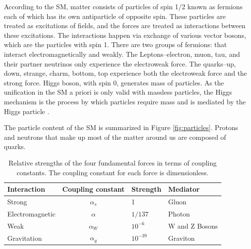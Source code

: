 According to the SM, matter consists of particles of spin 1/2 known as fermions each of which has its own antiparticle of opposite spin. These particles are treated as excitations of fields, and the forces are treated as interactions between these excitations. The interactions happen via exchange of various vector bosons, which are the particles with spin 1. There are two groups of fermions: that interact electromagnetically and weakly. The Leptons--electron, muon, tau, and their partner neutrinos only experience the electroweak force. The quarks--up, down, strange, charm, bottom, top experience both the electroweak force and the strong force. Higgs boson, with spin 0, generates mass of particles. As the unification in the SM a priori is only valid with massless particles, the Higgs mechanism is the process by which particles require mass \cite{Weinberg:1967,Salam:1968} and is mediated by the Higgs particle \cite{PhysRevLett.13.321, PhysRevLett.13.508}.


The particle content of the SM is summarized in Figure \ref{fig:particles}. Protons and neutrons that make up most of the matter around us are composed of quarks.

\begin{table}
\begin{center}
    \begin{tabular}{| l | c | l | l |}
    \hline
    {\bf Interaction} &  {\bf Coupling constant} & {\bf Strength} & {\bf Mediator} \\ \hline
    Strong & $\alpha_{s}$& 1  & Gluon \\ \hline
    Electromagnetic &$ \alpha $&  $1/137$  & Photon \\ \hline
    Weak & $\alpha_{W}$ &$10^{-6}$ &   W and Z Bosons\\ \hline
    Gravitation & $\alpha_{g}$ &$10^{-39}$  & Graviton \\
    \hline
    \end{tabular}
	\captionsetup{format=hang}
     \caption{Relative strengths of the four fundamental forces in terms of coupling constants. The coupling constant for each force is dimensionless.}

\end{center}
\end{table}



